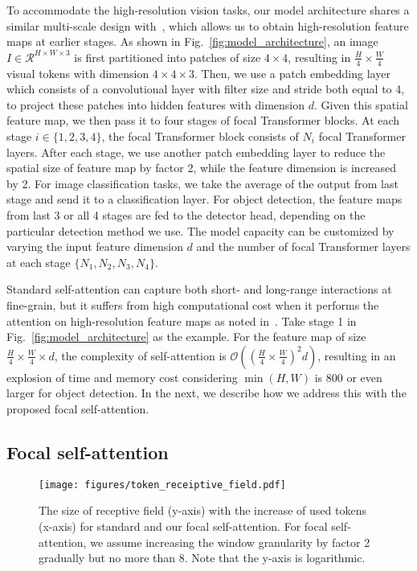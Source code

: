\documentclass{article}
\begin{document}
To accommodate the high-resolution vision tasks, our model architecture shares a similar multi-scale design with~\cite{wang2021pyramid,zhang2021multi,liu2021swin}, which allows us to obtain high-resolution feature maps at earlier stages. As shown in Fig.~\ref{fig:model_architecture}, an image $I \in \mathcal{R}^{H \times W \times 3}$ is first partitioned into patches of size $4\times 4$, resulting in $\frac{H}{4} \times \frac{W}{4}$ visual tokens with dimension $4 \times 4 \times 3$. Then, we use a patch embedding layer which consists of a convolutional layer with filter size and stride both equal to 4, to project these patches into hidden features with dimension $d$. Given this spatial feature map, we then pass it to four stages of focal Transformer blocks. At each stage $i \in \{1,2,3,4\}$, the focal Transformer block consists of $N_i$ focal Transformer layers. After each stage, we use another patch embedding layer to reduce the spatial size of feature map by factor 2, while the feature dimension is increased by 2. For image classification tasks, we take the average of the output from last stage and send it to a classification layer. For object detection, the feature maps from last 3 or all 4 stages are fed to the detector head, depending on the particular detection method we use. The model capacity can be customized by varying the input feature dimension $d$ and the number of focal Transformer layers at each stage $\{N_1, N_2, N_3, N_4\}$.

Standard self-attention can capture both short- and long-range interactions at fine-grain, but it suffers from high computational cost when it performs the attention on high-resolution feature maps as noted in~\cite{zhang2021multi}. 
Take stage 1 in Fig.~\ref{fig:model_architecture} as the example. For the feature map of size $\frac{H}{4} \times \frac{W}{4} \times d$, the complexity of self-attention is $\mathcal{O}((\frac{H}{4}\times \frac{W}{4})^2d)$, resulting in an explosion of time and memory cost considering $\min(H, W)$ is 800 or even larger for object detection. In the next, we describe how we address this with the proposed focal self-attention.

\subsection{Focal self-attention}

\begin{wrapfigure}{R}{0.4\textwidth}
\vspace{-5mm}
\begin{minipage}{0.4\textwidth}
\scriptsize
\centering
\hspace{-3mm}
\texttt{[image: figures/token\_receiptive\_field.pdf]}
\vspace{-1mm}
\caption{The size of receptive field (y-axis) with the increase of used tokens (x-axis) for standard and our focal self-attention. For focal self-attention, we assume increasing the window granularity by factor 2 gradually but no more than 8. Note that the y-axis is logarithmic.} 
\label{fig:receiptive_size_with_tokens}
\vspace{-3mm}
\end{minipage}
\end{wrapfigure}
\end{document}
